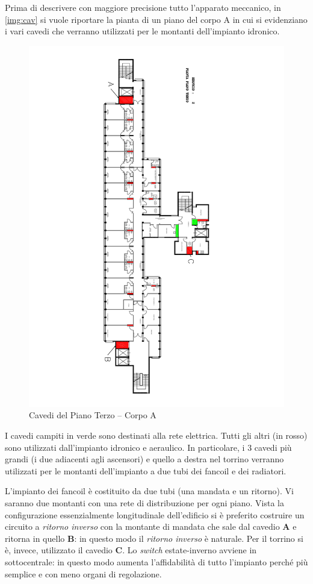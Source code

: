Prima di descrivere con maggiore precisione tutto l'apparato meccanico, in \vref{img:cav} si vuole riportare la pianta di un piano del corpo A in cui si evidenziano i vari cavedi che verranno utilizzati per le montanti dell'impianto idronico.
\begin{figure}
	\centering
	\includegraphics[width=\hsize]{6_4_cap/img/cavedi}
	\caption{Cavedi del Piano Terzo -- Corpo A}
	\label{img:cav}
\end{figure}
%
I cavedi campiti in verde sono destinati alla rete elettrica. Tutti gli altri (in rosso) sono utilizzati dall'impianto idronico e aeraulico. In particolare, i 3 cavedi più grandi (i due adiacenti agli ascensori) e quello a destra nel torrino verranno utilizzati per le montanti dell'impianto a due tubi dei fancoil e dei radiatori. 

L'impianto dei fancoil è costituito da due tubi (una mandata e un ritorno). Vi saranno due montanti con una rete di distribuzione per ogni piano. Vista la configurazione essenzialmente longitudinale dell'edificio si è preferito costruire un circuito a \emph{ritorno inverso} con la montante di mandata che sale dal cavedio \textbf{A} e ritorna in quello \textbf{B}: in questo modo il \emph{ritorno inverso} è naturale. Per il torrino si è, invece, utilizzato il cavedio \textbf{C}. Lo \emph{switch} estate-inverno avviene in sottocentrale: in questo modo aumenta l'affidabilità di tutto l'impianto perché più semplice e con meno organi di regolazione.

